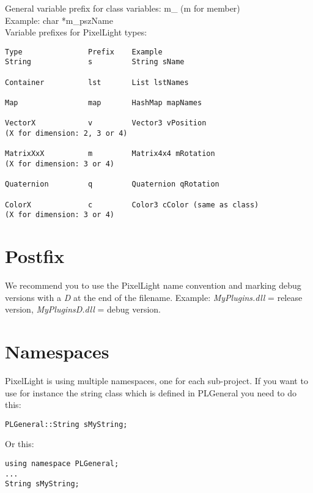 General variable prefix for class variables:
m\_ (m for member)\\
Example: char *m\_pszName\\

Variable prefixes for PixelLight types:

\begin{lstlisting}[caption=Variable prefixes for PixelLight types]
Type               Prefix    Example
String             s         String sName

Container          lst       List lstNames

Map                map       HashMap mapNames

VectorX            v         Vector3 vPosition
(X for dimension: 2, 3 or 4)

MatrixXxX          m         Matrix4x4 mRotation
(X for dimension: 3 or 4)

Quaternion         q         Quaternion qRotation

ColorX             c         Color3 cColor (same as class)
(X for dimension: 3 or 4)
\end{lstlisting}




\section{Postfix}
We recommend you to use the PixelLight name convention and marking debug versions with a \emph{D} at the end of the filename. Example: \emph{MyPlugins.dll} = release version, \emph{MyPluginsD.dll} = debug version.




\section{Namespaces}
PixelLight is using multiple namespaces, one for each sub-project. If you want to use for instance the string class which is defined in PLGeneral you need to do this:

\begin{lstlisting}[caption=Explicit namespace]
PLGeneral::String sMyString;
\end{lstlisting}

Or this:

\begin{lstlisting}[caption=Using namespace]
using namespace PLGeneral;
...
String sMyString;
\end{lstlisting}

